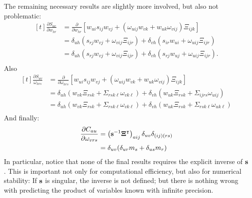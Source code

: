 \documentclass[a4paper]{article}
\newcommand{\bfs}{{\bf s}}
\newcommand{\T}{^{\top}}
\newcommand{\mat}[1]{\boldsymbol{#1}}
\newcommand{\<}{\langle}
\renewcommand{\>}{\rangle}
\renewcommand{\T}{^\intercal}%
\newcommand{\de}{\partial}
\newcommand{\bfxi}{\mat{\Xi}}
\begin{document}
The remaining necessary results are slightly more involved, but also
not problematic:
\begin{equation}
  \label{eq:18}
  \begin{aligned}[t]
    \frac{\de S_{uv}}{\de w_{hr}} &= \frac{\de}{\de w_{hr}}
    \left[w_{ui} s_{ij} w_{vj} + (\omega_{uij} w_{vk} +
      w_{uk}\omega_{vij})\Xi_{ijk}  \right]\\
    &= \delta_{uh} (s_{rj}w_{vj} + \omega_{vij} \Xi_{ijr}) +
    \delta_{vh} (s_{ir} w_{ui} + \omega_{uij} \Xi_{ijr})\\
    &= \delta_{uh} (s_{rj}w_{vj} + \omega_{vij} \Xi_{ijr}) +
    \delta_{vh} (s_{rj} w_{uj} + \omega_{uij} \Xi_{ijr}).\\
  \end{aligned}
\end{equation}
Also
\begin{equation}
  \label{eq:19}
  \begin{aligned}[t]
    \frac{\de S_{uv}}{\omega_{hrs}} &= \frac{\de}{\de \omega_{hrs}}
    \left[w_{ui} s_{ij} w_{vj} + (\omega_{uij} w_{vk} +
      w_{uk}\omega_{vij})\Xi_{ijk}  \right]\\
    &= \delta_{uh}( w_{vk}\Xi_{rsk} + \Sigma_{rsk\ell} \omega_{vk\ell}
    ) + \delta_{vh} ( w_{uk}\Xi_{rsk} + \Sigma_{ijrs} \omega_{uij} )\\
    &= \delta_{uh}( w_{vk}\Xi_{rsk} + \Sigma_{rsk\ell} \omega_{vk\ell}
    ) + \delta_{vh} ( w_{uk}\Xi_{rsk} + \Sigma_{rsk\ell} \omega_{uk\ell} )\\
  \end{aligned}
\end{equation}
And finally:
\begin{equation}
\label{eq:20}
\begin{aligned}
\frac{\de C_{au}}{\de \omega_{vrs}} &= \left(\bfs^{-1}\bfxi\T
    \right)_{aij} \delta_{uv} \delta_{(ij)(rs)}\\
    &= \delta_{uv} (\delta_{ur} m_s + \delta_{us} m_r)
  \end{aligned}
\end{equation}
In particular, notice that none of the final results requires the
explicit inverse of $\bfs$. This is important not only for
computational efficiency, but also for numerical stability: If $\bfs$
is singular, the inverse is not defined; but there is nothing wrong
with predicting the product of variables known with infinite precision.
\end{document}

